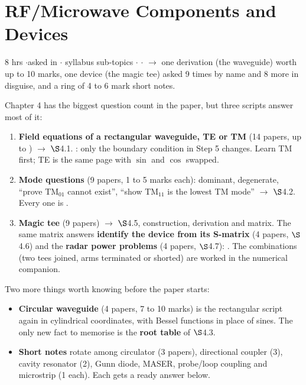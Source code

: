 \section{RF/Microwave Components and Devices}
{\color{sub}\footnotesize 8 hrs \gap$\cdot$\gap asked in 
\gap$\cdot$ syllabus sub-topics \gap$\cdot$\gap {} \gap$\cdot$\gap {}
$\rightarrow$ one derivation (the waveguide) worth up to 10 marks, one device (the magic tee)
asked 9 times by name and 8 more in disguise, and a ring of 4 to 6 mark short notes.}

\vspace{3pt}\noindent
\colorbox{gdL}{\makebox[\dimexpr\textwidth-2\fboxsep][l]{%
  \textcolor{gd}{\bfseries\footnotesize READ THIS FIRST}}}
\par\nobreak\vspace{3pt}

Chapter 4 has the biggest question count in the paper, but three scripts answer most of it:
\begin{enumerate}[label=\arabic*., leftmargin=1.4em, itemsep=1pt]
  \item \textbf{Field equations of a rectangular waveguide, TE or TM} (14 papers, up to
    ) $\rightarrow$ $\S$4.1. : only
    the boundary condition in Step 5 changes. Learn TM first; TE is the same page with
    $\sin$ and $\cos$ swapped.
  \item \textbf{Mode questions} (9 papers, 1 to 5 marks each): dominant, degenerate, ``prove
    TM$_{01}$ cannot exist'', ``show TM$_{11}$ is the lowest TM mode'' $\rightarrow$ $\S$4.2.
    Every one is .
  \item \textbf{Magic tee} (9 papers) $\rightarrow$ $\S$4.5, construction, derivation and
    matrix. The same matrix answers \textbf{identify the device from its S-matrix}
    (4 papers, $\S$4.6) and the \textbf{radar power problems} (4 papers, $\S$4.7):
    . The combinations (two tees joined, arms terminated
    or shorted) are worked in the numerical companion.
\end{enumerate}
Two more things worth knowing before the paper starts:
\begin{itemize}
  \item \textbf{Circular waveguide} (4 papers, 7 to 10 marks) is the rectangular script
    again in cylindrical coordinates, with Bessel functions in place of sines. The only new
    fact to memorise is the \textbf{root table} of $\S$4.3.
  \item \textbf{Short notes} rotate among circulator (3 papers), directional coupler
    (3), cavity resonator (2), Gunn diode, MASER, probe/loop coupling and microstrip (1 each).
    Each gets a ready answer below.
\end{itemize}

